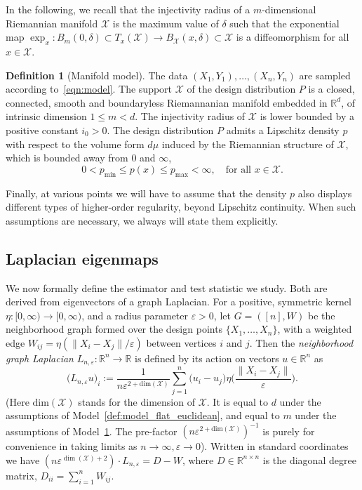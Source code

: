 \documentclass{article}
\newcommand{\Reals}{\mathbb{R}}
\newcommand{\1}{\mathbf{1}}
\newcommand{\Rd}{\Reals^d}
\newcommand{\mc}[1]{\mathcal{#1}}
\theoremstyle{alden}
\theoremstyle{aldenthm}
\theoremstyle{definition}
\newtheorem{definition}{Definition}[section]
\theoremstyle{remark}
\begin{document}
In the following, we recall that the injectivity radius of a $m$-dimensional Riemannian manifold $\mc{X}$ is the maximum value of $\delta$ such that the exponential map $\exp_x: B_m(0,\delta) \subset T_x(\mc{X}) \to B_{\mc{X}}(x,\delta) \subset \mc{X}$ is a diffeomorphism for all $x \in \mc{X}$.
\begin{definition}[Manifold model]
	\label{def:model_manifold}
	The data $(X_1,Y_1),\ldots,(X_n,Y_n)$ are sampled according to~\eqref{eqn:model}. 
	The support $\mc{X}$ of the design distribution $P$ is a closed, connected, smooth and boundaryless Riemannanian manifold embedded in $\Rd$, of intrinsic dimension $1 \leq m < d$. The injectivity radius of $\mc{X}$ is lower bounded by a positive constant $i_0 > 0$. The design distribution $P$ admits a Lipschitz density $p$ with respect to the volume form $d\mu$ induced by the Riemannian structure of $\mc{X}$, which is bounded away from $0$ and $\infty$,
	\begin{equation*}
	0 < p_{\min} \leq p(x) \leq p_{\max} < \infty, \quad \textrm{for all $x \in \mc{X}$.}
	\end{equation*}
\end{definition}

Finally, at various points we will have to assume that the density $p$ also displays different types of higher-order regularity, beyond Lipschitz continuity. When such assumptions are necessary, we always will state them explicitly.

\subsection{Laplacian eigenmaps}
We now formally define the estimator and test statistic we study. Both are derived from eigenvectors of a graph Laplacian.  For a positive, symmetric kernel $\eta: [0,\infty) \to [0,\infty)$, and a radius parameter $\varepsilon > 0$, let $G = ([n],W)$ be the neighborhood graph formed over the design points $\{X_1,\ldots,X_n\}$, with a weighted edge $W_{ij} = \eta(\|X_i - X_j\|/\varepsilon)$ between vertices $i$ and $j$. Then the 
\emph{neighborhood graph Laplacian} $L_{n,\varepsilon}: \Reals^n \to \Reals$ is defined by its action on vectors $u \in \Reals^n$ as
\begin{equation}
\label{eqn:neighborhood_graph_laplacian}
\bigl(L_{n,\varepsilon}u\bigr)_i := \frac{1}{n\varepsilon^{2 + \mathrm{dim}(\mc{X})}} \sum_{j = 1}^{n} \bigl(u_i - u_j\bigr) \eta\biggl(\frac{\|X_i - X_j\|}{\varepsilon}\biggr).
\end{equation}
(Here $\mathrm{dim}(\mc{X})$ stands for the dimension of $\mc{X}$. It is equal to $d$ under the assumptions of Model~\ref{def:model_flat_euclidean}, and equal to $m$ under the assumptions of Model~\ref{def:model_manifold}. The pre-factor $(n\varepsilon^{2 + \mathrm{dim}(\mc{X})})^{-1}$ is purely for convenience in taking limits as $n \to \infty, \varepsilon \to 0$). Written in standard coordinates we have $(n\varepsilon^{\dim(\mc{X}) + 2}) \cdot L_{n,\varepsilon} = D - W$, where $D \in \Reals^{n \times n}$ is the diagonal degree matrix, $D_{ii} = \sum_{i = 1}^{n} W_{ij}$.
\end{document}
